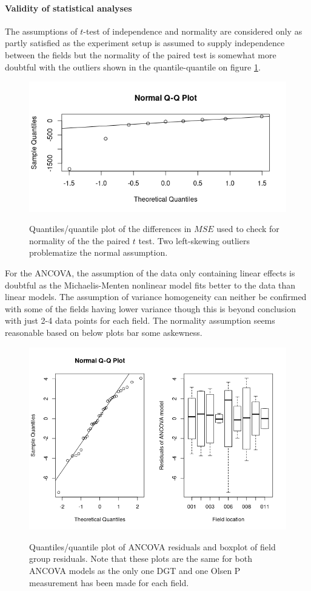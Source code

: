 \documentclass[11pt,fleqn]{article}
\begin{document}
\paragraph{Validity of statistical analyses} The assumptions of \(t\)-test of independence and normality are considered only as partly satisfied as the experiment setup is assumed to supply independence between the fields but the normality of the paired test is somewhat more doubtful with the outliers shown in the quantile-quantile on figure \ref{fig:qq}. 
\begin{figure}[H]
	\centering
	\includegraphics[width=.5\linewidth]{p2_t_qq}
	\label{fig:tqq}
	\caption{Quantiles/quantile plot of the differences in \(MSE\) used to check for normality of the the paired $t$ test. Two left-skewing outliers problematize the normal assumption.}\label{fig:qq}
\end{figure} \noindent 
For the ANCOVA, the assumption of the data only containing linear effects is doubtful as the Michaelis-Menten nonlinear model fits better to the data than linear models. The assumption of variance homogeneity can neither be confirmed with some of the fields having lower variance though this is beyond conclusion with just 2-4 data points for each field. The normality assumption seems reasonable based on below plots bar some askewness.
\begin{figure}[H]
	\centering
	\includegraphics[width=.75\linewidth]{p2_ancova_qq}
	\label{fig:tqq}
	\caption{Quantiles/quantile plot of ANCOVA residuals and boxplot of field group residuals. Note that these plots are the same for both ANCOVA models as the only one DGT and one Olsen P measurement has been made for each field.}
\end{figure} \noindent 
\end{document}
